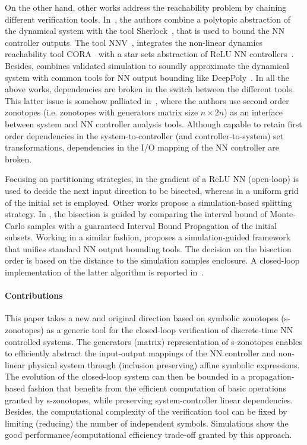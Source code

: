 \documentclass[journal]{IEEEtran}
\begin{document}
On the other hand, other works address the reachability problem by chaining different verification tools. In~\cite{yang2019efficient}, the authors combine a polytopic abstraction of the dynamical system with the tool Sherlock~\cite{dutta2017output}, that is used to bound the NN controller outputs. The tool NNV~\cite{tran2020nnv}, integrates the non-linear dynamics  reachability tool CORA~\cite{althoff2015introduction} with a star sets abstraction of ReLU NN controllers~\cite{tran2020verification}. Besides,  \cite{claviere2021safety} combines validated simulation to soundly approximate the dynamical system with common tools for NN output bounding like DeepPoly~\cite{singh2019abstract}. In all the above works, dependencies are broken in the switch  between the different tools. This latter issue is somehow palliated in~\cite{schilling2021verification}, where the authors use second order zonotopes (i.e. zonotopes with generators matrix size $n \times 2n$) as an interface between system and NN controller analysis tools. Although capable to retain first order dependencies in the system-to-controller (and controller-to-system) set transformations, dependencies in the I/O mapping of the NN controller are broken. 

Focusing on partitioning strategies, in \cite{wang2018formal} the gradient of a ReLU NN (open-loop) is used to decide the next input direction to be bisected, whereas in \cite{xiang2018output} a uniform grid of the initial set is employed. Other works propose a simulation-based splitting strategy. In \cite{xiang2020reachable}, the bisection is guided by comparing  the  interval bound of Monte-Carlo samples with a guaranteed  Interval Bound Propagation \cite{gowal2018effectiveness} of the initial subsets. Working in a similar fashion, \cite{everett2020robustness} proposes a simulation-guided framework that unifies standard NN output bounding tools. The decision on the bisection order is based on the distance to the simulation samples enclosure. A closed-loop implementation of the latter algorithm is reported in~\cite{everett2021efficient}.


\paragraph*{Contributions} This paper takes a new and original direction based on symbolic zonotopes (s-zonotopes) as a generic tool for the closed-loop verification of discrete-time NN controlled systems. The generators (matrix) representation of s-zonotopes enables to efficiently abstract the input-output mappings of the NN controller and non-linear physical system through (inclusion preserving) affine symbolic expressions. The evolution of the closed-loop system can then be bounded in a propagation-based fashion that benefits from the efficient computation of basic operations granted by s-zonotopes, while preserving system-controller linear dependencies. Besides,  the computational complexity of the verification tool can be fixed by limiting (reducing) the number of independent symbols. Simulations show the good performance/computational efficiency trade-off granted by this approach.
\end{document}
